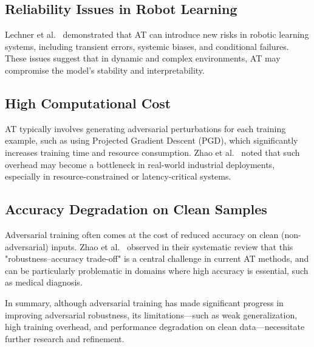 \documentclass[10pt,twocolumn,letterpaper]{article}
\begin{document}
\subsection{Reliability Issues in Robot Learning}
Lechner et al.~\cite{lechner2021adversarialtrainingreadyrobot} demonstrated that AT can introduce new risks in robotic learning systems, including transient errors, systemic biases, and conditional failures. These issues suggest that in dynamic and complex environments, AT may compromise the model’s stability and interpretability.

\subsection{High Computational Cost}
AT typically involves generating adversarial perturbations for each training example, such as using Projected Gradient Descent (PGD), which significantly increases training time and resource consumption. Zhao et al.~\cite{zhao2022review} noted that such overhead may become a bottleneck in real-world industrial deployments, especially in resource-constrained or latency-critical systems.

\subsection{Accuracy Degradation on Clean Samples}
Adversarial training often comes at the cost of reduced accuracy on clean (non-adversarial) inputs. Zhao et al.~\cite{a15080283} observed in their systematic review that this "robustness–accuracy trade-off" is a central challenge in current AT methods, and can be particularly problematic in domains where high accuracy is essential, such as medical diagnosis.

In summary, although adversarial training has made significant progress in improving adversarial robustness, its limitations—such as weak generalization, high training overhead, and performance degradation on clean data—necessitate further research and refinement.

{\small


}
\end{document}
